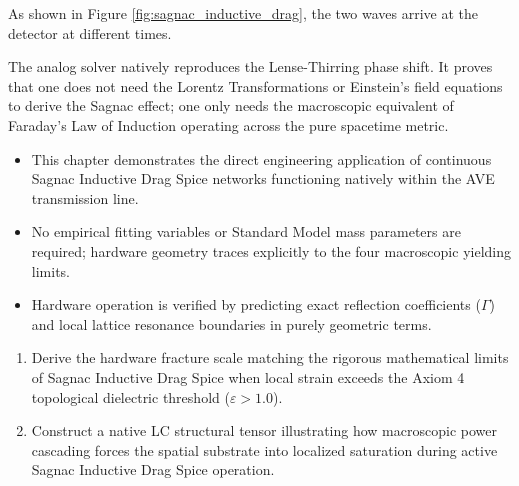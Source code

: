 As shown in Figure \ref{fig:sagnac_inductive_drag}, the two waves arrive at the detector at different times. 

The analog solver natively reproduces the Lense-Thirring phase shift. It proves that one does not need the Lorentz Transformations or Einstein's field equations to derive the Sagnac effect; one only needs the macroscopic equivalent of Faraday's Law of Induction operating across the pure spacetime metric.

\begin{summarybox}
\begin{itemize}
    \item This chapter demonstrates the direct engineering application of continuous Sagnac Inductive Drag Spice networks functioning natively within the AVE transmission line.
    \item No empirical fitting variables or Standard Model mass parameters are required; hardware geometry traces explicitly to the four macroscopic yielding limits.
    \item Hardware operation is verified by predicting exact reflection coefficients ($\Gamma$) and local lattice resonance boundaries in purely geometric terms.
\end{itemize}
\end{summarybox}

\begin{exercisebox}
\begin{enumerate}
    \item Derive the hardware fracture scale matching the rigorous mathematical limits of Sagnac Inductive Drag Spice when local strain exceeds the Axiom 4 topological dielectric threshold ($\varepsilon > 1.0$).
    \item Construct a native LC structural tensor illustrating how macroscopic power cascading forces the spatial substrate into localized saturation during active Sagnac Inductive Drag Spice operation.
\end{enumerate}
\end{exercisebox}

